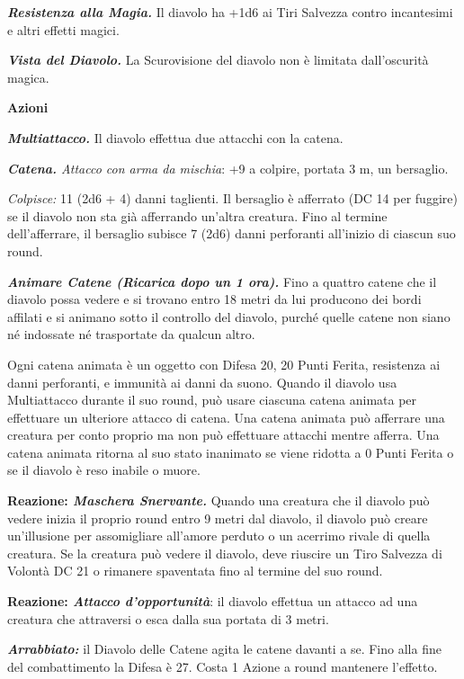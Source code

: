 \begin{multicols}{2}
{\emph{\textbf{Resistenza alla Magia.}} Il diavolo ha +1d6 ai Tiri Salvezza contro incantesimi e altri effetti magici.

\emph{\textbf{Vista del Diavolo.}} La Scurovisione del diavolo non è limitata dall'oscurità magica.

\textbf{Azioni}

\emph{\textbf{Multiattacco.}} Il diavolo effettua due attacchi con la catena.

\emph{\textbf{Catena.} Attacco con arma da mischia}: +9 a colpire, portata 3 m, un bersaglio.

\emph{Colpisce:} 11 (2d6 + 4) danni taglienti. Il bersaglio è afferrato (DC 14 per fuggire) se il diavolo non sta già afferrando un'altra creatura. Fino al termine dell'afferrare, il bersaglio subisce 7 (2d6) danni perforanti all'inizio di ciascun suo round.

\emph{\textbf{Animare Catene (Ricarica dopo un 1 ora).}} Fino a quattro catene che il diavolo possa vedere e si trovano entro 18 metri da lui producono dei bordi affilati e si animano sotto il controllo del diavolo, purché quelle catene non siano né indossate né trasportate da qualcun altro.

Ogni catena animata è un oggetto con Difesa 20, 20 Punti Ferita, resistenza ai danni perforanti, e immunità ai danni da suono. Quando il diavolo usa Multiattacco durante il suo round, può usare ciascuna catena animata per effettuare un ulteriore attacco di catena. Una catena animata può afferrare una creatura per conto proprio ma non può effettuare attacchi mentre afferra. Una catena animata ritorna al suo stato inanimato se viene ridotta a 0 Punti Ferita o se il diavolo è reso inabile o muore.

\textbf{Reazione: \emph{Maschera Snervante.}} Quando una creatura che il diavolo può vedere inizia il proprio round entro 9 metri dal diavolo, il diavolo può creare un'illusione per assomigliare all'amore perduto o un acerrimo rivale di quella creatura. Se la creatura può vedere il diavolo, deve riuscire un Tiro Salvezza di Volontà DC 21 o rimanere spaventata fino al termine del suo round.

\textbf{Reazione: \emph{Attacco d'opportunità}}: il diavolo effettua un attacco ad una creatura che attraversi o esca dalla sua portata di 3 metri.

\emph{\textbf{Arrabbiato:}} il Diavolo delle Catene agita le catene davanti a se. Fino alla fine del combattimento la Difesa è 27. Costa 1 Azione a round mantenere l'effetto.

}
\end{multicols}
